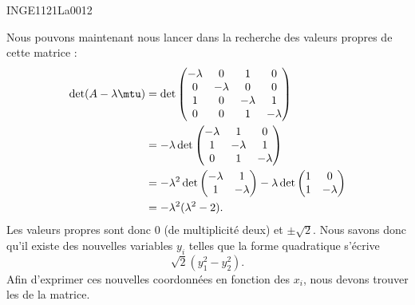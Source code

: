 \begin{corrige}{INGE1121La0012}
\begin{enumerate}
			Nous pouvons maintenant nous lancer dans la recherche des valeurs propres de cette matrice :
			\begin{equation}
				\begin{aligned}[]
					\det(A-\lambda \mtu)&=\det\begin{pmatrix}
						 -\lambda	&	0	&	1	&	0	\\
						 0	&	-\lambda	&	0	&	0	\\
						 1	&	0	&	-\lambda	&	1	\\ 
						 0	&	0	&	1	&	-\lambda	 
						  \end{pmatrix}\\
						  &=
						  -\lambda\det
						  \begin{pmatrix}
							  -\lambda	&	1	&	0	\\
							  1	&	-\lambda	&	1	\\
							  0	&	1	&	-\lambda
						\end{pmatrix}\\
						&=
						-\lambda^2\det\begin{pmatrix}
							-\lambda	&	1	\\ 
							1	&	-\lambda	
						\end{pmatrix}
						-\lambda\det
						\begin{pmatrix}
							1	&	0	\\ 
							1	&	-\lambda	
						\end{pmatrix}\\
						&=-\lambda^2(\lambda^2-2).
				\end{aligned}
			\end{equation}
			Les valeurs propres sont donc $0$ (de multiplicité deux) et $\pm\sqrt{2}$. Nous savons donc qu'il existe des nouvelles variables $y_i$ telles que la forme quadratique s'écrive
			\begin{equation}		\label{exoLa0012quddiafy}
				\sqrt{2}(y_1^2-y_2^2).
			\end{equation}
			Afin d'exprimer ces nouvelles coordonnées en fonction des $x_i$, nous devons trouver les   de la matrice.


\end{enumerate}
\end{corrige}
